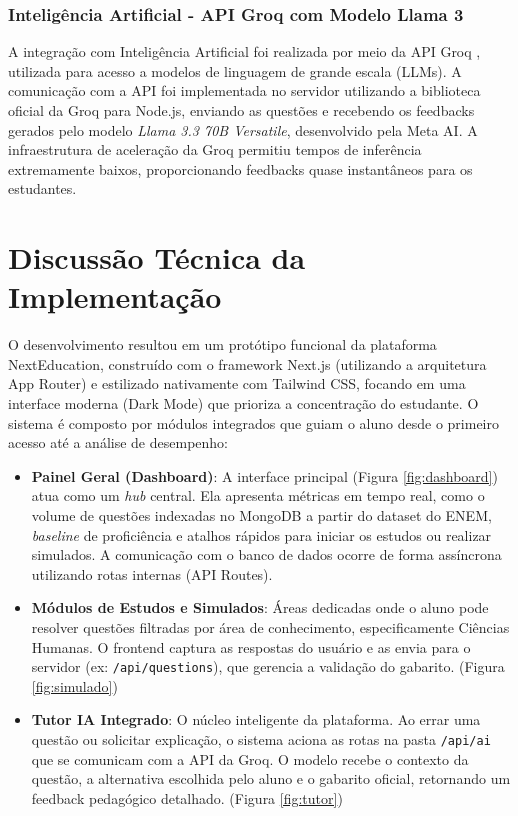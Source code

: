 \documentclass[
12pt,
openright,
oneside,
a4paper,
brazil
]{abntex2}
\begin{document}
\subsection{Inteligência Artificial - API Groq com Modelo Llama 3}
A integração com Inteligência Artificial foi realizada por meio da API Groq \cite{groq}, utilizada para acesso a modelos de linguagem de grande escala (LLMs). A comunicação com a API foi implementada no servidor utilizando a biblioteca oficial da Groq para Node.js, enviando as questões e recebendo os feedbacks gerados pelo modelo \textit{Llama 3.3 70B Versatile}, desenvolvido pela Meta AI. A infraestrutura de aceleração da Groq permitiu tempos de inferência extremamente baixos, proporcionando feedbacks quase instantâneos para os estudantes.


\chapter{Discussão Técnica da Implementação}

O desenvolvimento resultou em um protótipo funcional da plataforma NextEducation, construído com o framework Next.js (utilizando a arquitetura App Router) e estilizado nativamente com Tailwind CSS, focando em uma interface moderna (Dark Mode) que prioriza a concentração do estudante. O sistema é composto por módulos integrados que guiam o aluno desde o primeiro acesso até a análise de desempenho:

\begin{itemize}
    \item \textbf{Painel Geral (Dashboard)}: A interface principal (Figura \ref{fig:dashboard}) atua como um \textit{hub} central. Ela apresenta métricas em tempo real, como o volume de questões indexadas no MongoDB a partir do dataset do ENEM, \textit{baseline} de proficiência e atalhos rápidos para iniciar os estudos ou realizar simulados. A comunicação com o banco de dados ocorre de forma assíncrona utilizando rotas internas (API Routes).
    
    \item \textbf{Módulos de Estudos e Simulados}: Áreas dedicadas onde o aluno pode resolver questões filtradas por área de conhecimento, especificamente Ciências Humanas. O frontend captura as respostas do usuário e as envia para o servidor (ex: \texttt{/api/questions}), que gerencia a validação do gabarito. (Figura \ref{fig:simulado})
    
    \item \textbf{Tutor IA Integrado}: O núcleo inteligente da plataforma. Ao errar uma questão ou solicitar explicação, o sistema aciona as rotas na pasta \texttt{/api/ai} que se comunicam com a API da Groq. O modelo recebe o contexto da questão, a alternativa escolhida pelo aluno e o gabarito oficial, retornando um feedback pedagógico detalhado. (Figura \ref{fig:tutor})
\end{itemize}
\end{document}
